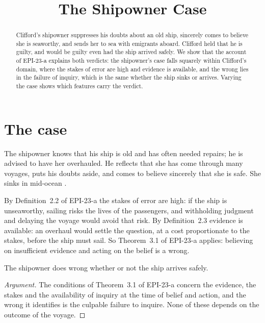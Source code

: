 \documentclass{situationist-preprint}
\title{The Shipowner Case}
\begin{document}
\maketitle

\begin{abstract}
Clifford's shipowner suppresses his doubts about an old ship, sincerely comes to believe she is seaworthy, and sends her to sea with emigrants aboard. Clifford held that he is guilty, and would be guilty even had the ship arrived safely. We show that the account of EPI-23-a explains both verdicts: the shipowner's case falls squarely within Clifford's domain, where the stakes of error are high and evidence is available, and the wrong lies in the failure of inquiry, which is the same whether the ship sinks or arrives. Varying the case shows which features carry the verdict.
\end{abstract}

\section{The case}

The shipowner knows that his ship is old and has often needed repairs; he is advised to have her overhauled. He reflects that she has come through many voyages, puts his doubts aside, and comes to believe sincerely that she is safe. She sinks in mid-ocean \citep{Clifford1877}.

By Definition~2.2 of EPI-23-a the stakes of error are high: if the ship is unseaworthy, sailing risks the lives of the passengers, and withholding judgment and delaying the voyage would avoid that risk. By Definition~2.3 evidence is available: an overhaul would settle the question, at a cost proportionate to the stakes, before the ship must sail. So Theorem~3.1 of EPI-23-a applies: believing on insufficient evidence and acting on the belief is a wrong.

\begin{proposition}\label{p:outcome}
The shipowner does wrong whether or not the ship arrives safely.
\end{proposition}

\begin{proof}[Argument]
The conditions of Theorem~3.1 of EPI-23-a concern the evidence, the stakes and the availability of inquiry at the time of belief and action, and the wrong it identifies is the culpable failure to inquire. None of these depends on the outcome of the voyage.
\end{proof}
\end{document}
